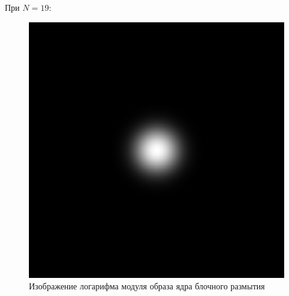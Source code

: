 \documentclass[a4paper]{article}
\begin{document}
При $N = 19$:

\begin{figure}[H]
    \centering
    \includegraphics[width=0.51\linewidth]{2/19_abs_fourier_log_norm_gaussian.png}
    \caption{Изображение логарифма модуля образа ядра блочного размытия}
\end{figure}\
\end{document}
